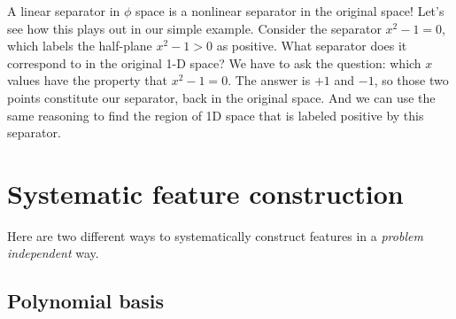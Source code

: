 A linear separator in $\phi$ space is a nonlinear separator in the
original space!  Let's see how this plays out in our simple example.
Consider the separator $x^2  - 1 = 0$, which labels the half-plane
$x^2 -1 > 0$ as positive.  What separator does it correspond to in the
original 1-D space? 
We have to ask the question:  which $x$ values have the property that
$x^2 - 1 = 0$.  The answer is $+1$ and $-1$, so those two points
constitute our separator, back in the original space.  And we can use
the same reasoning to find the region of 1D space that is labeled
positive by this separator.

\begin{examplebox}
\begin{center}
\end{center}
\end{examplebox}


\section{Systematic feature construction}
Here are two different ways to systematically construct features in a
{\em problem independent} way.

\subsection{Polynomial basis}

